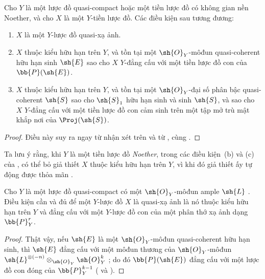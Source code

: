 \documentclass[oneside,10pt]{amsart}
\let\EGAOriginalLabel\label
\renewcommand{\label}[1]{\phantomsection\EGAOriginalLabel{#1}}
\begin{document}
\begin{proposition}[5.3.2]
\label{II.5.3.2}
Cho $Y$ là một lược đồ quasi-compact hoặc một tiền lược đồ có không gian nền Noether, và cho $X$ là một $Y$-tiền lược đồ.
Các điều kiện sau tương đương:
\begin{enumerate}
  \item[{\rm(a)}] $X$ là một $Y$-lược đồ quasi-xạ ảnh.
  \item[{\rm(b)}] $X$ thuộc kiểu hữu hạn trên $Y$, và tồn tại một $\sh{O}_Y$-môđun quasi-coherent hữu hạn sinh $\sh{E}$ sao cho $X$ $Y$-đẳng cấu với một tiền lược đồ con của $\bb{P}(\sh{E})$.
  \item[{\rm(c)}] $X$ thuộc kiểu hữu hạn trên $Y$, và tồn tại một $\sh{O}_Y$-đại số phân bậc quasi-coherent $\sh{S}$ sao cho $\sh{S}_1$ hữu hạn sinh và sinh $\sh{S}$, và sao cho $X$ $Y$-đẳng cấu với một tiền lược đồ con cảm sinh trên một tập mở trù mật khắp nơi của $\Proj(\sh{S})$.
\end{enumerate}
\end{proposition}

\begin{proof}
Điều này suy ra ngay từ nhận xét trên và từ ,  cùng .
\end{proof}

Ta lưu ý rằng, khi $Y$ là một tiền lược đồ \emph{Noether}, trong các điều kiện~(b) và (c) của , có thể bỏ giả thiết $X$ thuộc kiểu hữu hạn trên $Y$, vì khi đó giả thiết ấy tự động được thỏa mãn .

\begin{corollary}[5.3.3]
\label{II.5.3.3}
Cho $Y$ là một lược đồ quasi-compact có một $\sh{O}_Y$-môđun ample $\sh{L}$ .
Điều kiện cần và đủ để một $Y$-lược đồ $X$ là quasi-xạ ảnh là nó thuộc kiểu hữu hạn trên $Y$ và đẳng cấu với một $Y$-lược đồ con của một phân thớ xạ ảnh dạng $\bb{P}_Y^r$.
\end{corollary}

\begin{proof}
Thật vậy, nếu $\sh{E}$ là một $\sh{O}_Y$-môđun quasi-coherent hữu hạn sinh, thì $\sh{E}$ đẳng cấu với một môđun thương của $\sh{O}_Y$-môđun $\sh{L}^{\otimes(-n)}\otimes_{\sh{O}_Y}\sh{O}_Y^k$ ; do đó $\bb{P}(\sh{E})$ đẳng cấu với một lược đồ con đóng của $\bb{P}_Y^{k-1}$ ( và ).
\end{proof}
\end{document}
